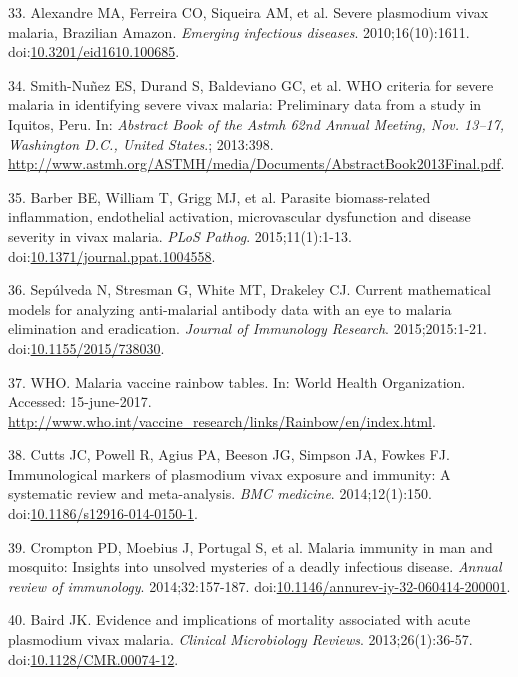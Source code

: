 \documentclass[]{article}
\begin{document}
\hypertarget{ref-alexandre2010}{}
33. Alexandre MA, Ferreira CO, Siqueira AM, et al. Severe plasmodium
vivax malaria, Brazilian Amazon. \emph{Emerging infectious diseases}.
2010;16(10):1611.
doi:\href{https://doi.org/10.3201/eid1610.100685}{10.3201/eid1610.100685}.

\hypertarget{ref-smith2013}{}
34. Smith-Nuñez ES, Durand S, Baldeviano GC, et al. WHO criteria for
severe malaria in identifying severe vivax malaria: Preliminary data
from a study in Iquitos, Peru. In: \emph{Abstract Book of the Astmh 62nd
Annual Meeting, Nov. 13--17, Washington D.C., United States}.; 2013:398.
\url{http://www.astmh.org/ASTMH/media/Documents/AbstractBook2013Final.pdf}.

\hypertarget{ref-barber2015}{}
35. Barber BE, William T, Grigg MJ, et al. Parasite biomass-related
inflammation, endothelial activation, microvascular dysfunction and
disease severity in vivax malaria. \emph{PLoS Pathog}. 2015;11(1):1-13.
doi:\href{https://doi.org/10.1371/journal.ppat.1004558}{10.1371/journal.ppat.1004558}.

\hypertarget{ref-sepulveda2015}{}
36. Sepúlveda N, Stresman G, White MT, Drakeley CJ. Current mathematical
models for analyzing anti-malarial antibody data with an eye to malaria
elimination and eradication. \emph{Journal of Immunology Research}.
2015;2015:1-21.
doi:\href{https://doi.org/10.1155/2015/738030}{10.1155/2015/738030}.

\hypertarget{ref-rainbow2016}{}
37. WHO. Malaria vaccine rainbow tables. In: World Health Organization.
Accessed: 15-june-2017.
\url{http://www.who.int/vaccine_research/links/Rainbow/en/index.html}.

\hypertarget{ref-cutts2014meta}{}
38. Cutts JC, Powell R, Agius PA, Beeson JG, Simpson JA, Fowkes FJ.
Immunological markers of plasmodium vivax exposure and immunity: A
systematic review and meta-analysis. \emph{BMC medicine}.
2014;12(1):150.
doi:\href{https://doi.org/10.1186/s12916-014-0150-1}{10.1186/s12916-014-0150-1}.

\hypertarget{ref-crompton2014rev}{}
39. Crompton PD, Moebius J, Portugal S, et al. Malaria immunity in man
and mosquito: Insights into unsolved mysteries of a deadly infectious
disease. \emph{Annual review of immunology}. 2014;32:157-187.
doi:\href{https://doi.org/10.1146/annurev-iy-32-060414-200001}{10.1146/annurev-iy-32-060414-200001}.

\hypertarget{ref-baird2013}{}
40. Baird JK. Evidence and implications of mortality associated with
acute plasmodium vivax malaria. \emph{Clinical Microbiology Reviews}.
2013;26(1):36-57.
doi:\href{https://doi.org/10.1128/CMR.00074-12}{10.1128/CMR.00074-12}.
\end{document}
